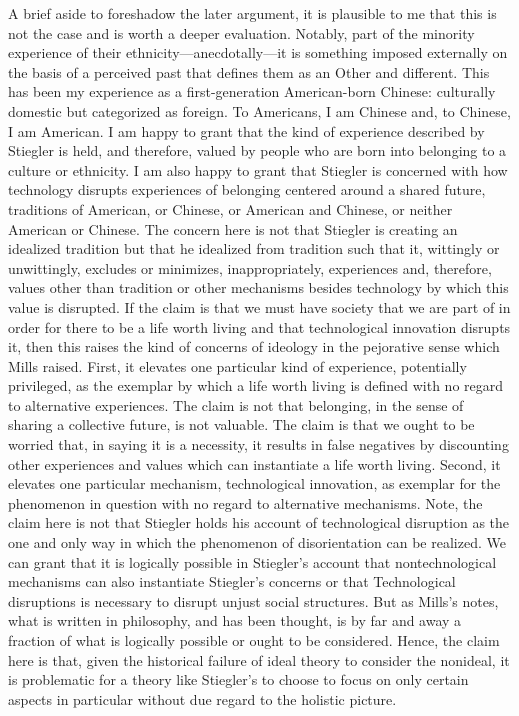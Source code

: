 \documentclass[letterpaper,notitlepage,12pt]{article}
\begin{document}
A brief aside to foreshadow the later argument, it is plausible to me that this
is not the case and is worth a deeper evaluation. 
Notably, part of the minority
experience of their ethnicity---anecdotally---it is something imposed externally
on the basis of a perceived past that defines them as an Other and different.
This has been my experience as a first-generation American-born Chinese:
culturally domestic but categorized as foreign.
To Americans, I am Chinese and, to Chinese, I am American.
I am happy to grant that the kind of experience described by Stiegler is held,
and therefore, valued by people who are born into belonging to a culture or
ethnicity.
I am also happy to grant that Stiegler is concerned with how technology disrupts
experiences of belonging centered around a shared future, traditions of
American, or Chinese, or American and Chinese, or neither American or Chinese.
The concern here is not that Stiegler is creating an idealized tradition but
that he idealized from tradition such that it, wittingly or unwittingly, excludes or
minimizes, inappropriately, experiences and, therefore, values other than
tradition or other mechanisms besides technology by which this value is
disrupted.
If the claim is that we must have society that we are part of in order for there
to be a life worth living and that technological innovation disrupts it, then
this raises the kind of concerns of ideology in the pejorative sense which Mills
raised.
First, it elevates one particular kind of experience, potentially privileged,
as the exemplar by which a life worth living is defined with no regard to
alternative experiences.
The claim is not that belonging, in the sense of sharing a collective future, is
not valuable.
The claim is that we ought to be worried that, in saying it is a necessity, it
results in false negatives by discounting other experiences and values which can
instantiate a life worth living.
Second, it elevates one particular mechanism, technological innovation, as
exemplar for the phenomenon in question with no regard to alternative
mechanisms.
Note, the claim here is not that Stiegler holds his account of technological
disruption as the one and only way in which the phenomenon of disorientation can
be realized.
We can grant that it is logically possible in Stiegler's account that
nontechnological mechanisms can also instantiate Stiegler's concerns or that
Technological disruptions is necessary to disrupt unjust social structures.
But as Mills's notes, what is written in philosophy, and has been thought, is by
far and away a fraction of what is logically possible or ought to be considered.
Hence, the claim here is that, given the historical failure of ideal theory to
consider the nonideal, it is problematic for a theory like Stiegler's to choose
to focus on only certain aspects in particular without due regard to the
holistic picture.
\end{document}
